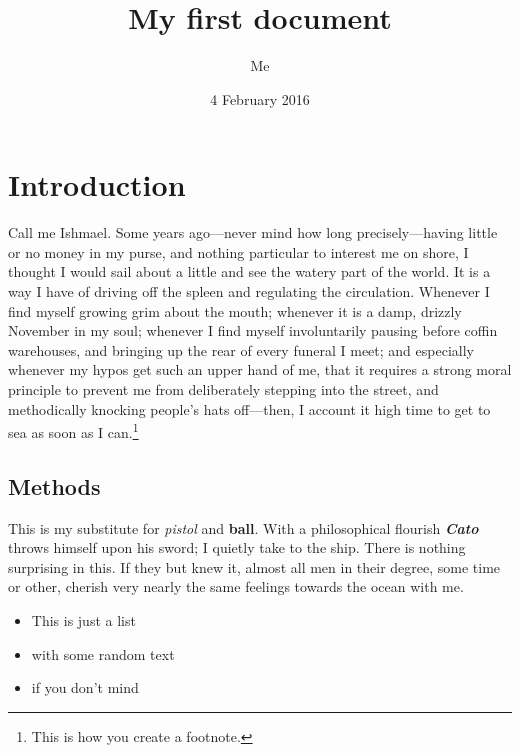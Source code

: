 \documentclass[12pt,a4paper]{article}
\title{My first document}
\author{Me}
\date{4 February 2016}
\begin{document}
\maketitle
\tableofcontents


\section{Introduction}
\label{s:introduction}
Call me Ishmael. Some years ago---never mind how long precisely---having little or no money in my purse, and nothing particular to interest me on shore, I thought I would sail about a little and see the watery part of the world. It is a way I have of driving off the spleen and regulating the circulation. Whenever I find myself growing grim about the mouth; whenever it is a damp, drizzly November in my soul; whenever I find myself involuntarily pausing before coffin warehouses, and bringing up the rear of every funeral I meet; and especially whenever my hypos get such an upper hand of me, that it requires a strong moral principle to prevent me from deliberately stepping into the street, and methodically knocking people's hats off---then, I account it high time to get to sea as soon as I can.\footnote{This is how you create a footnote.}

\subsection{Methods}

This is my substitute for \textit{pistol} and \textbf{ball}. With a philosophical flourish \textbf{\textit{Cato}} throws himself upon his sword; I quietly take to the ship. There is nothing surprising in this. If they but knew it, almost all men in their degree, some time or other, cherish very nearly the same feelings towards the ocean with me.

\begin{itemize}
    \item This is just a list
    \item with some random text
    \item if you don't mind
\end{itemize}
\end{document}
